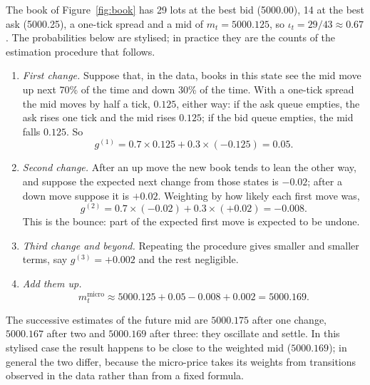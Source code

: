 \begin{example}
\label{ex:microprice}
The book of Figure~\ref{fig:book} has 29 lots at the best bid (5000.00), 14 at the best ask
(5000.25), a one-tick spread and a mid of $m_t = 5000.125$, so $\iota_t = 29/43 \approx 0.67$. The
probabilities below are stylised; in practice they are the counts of the estimation procedure that
follows.
\begin{enumerate}[leftmargin=1.8em,itemsep=2pt]
\item \emph{First change.} Suppose that, in the data, books in this state see the mid move up next 70\%
  of the time and down 30\% of the time. With a one-tick spread the mid moves by half a tick, $0.125$,
  either way: if the ask queue empties, the ask rises one tick and the mid rises $0.125$; if the bid
  queue empties, the mid falls $0.125$. So
  \[
    g^{(1)} = 0.7 \times 0.125 + 0.3 \times (-0.125) = 0.05 .
  \]
\item \emph{Second change.} After an up move the new book tends to lean the other way, and suppose the
  expected next change from those states is $-0.02$; after a down move suppose it is $+0.02$. Weighting
  by how likely each first move was,
  \[
    g^{(2)} = 0.7 \times (-0.02) + 0.3 \times (+0.02) = -0.008 .
  \]
This is the bounce: part of the expected first move is expected to be undone.
\item \emph{Third change and beyond.} Repeating the procedure gives smaller and smaller terms, say
  $g^{(3)} = +0.002$ and the rest negligible.
\item \emph{Add them up.}
  \[
    m^{\text{micro}}_t \approx 5000.125 + 0.05 - 0.008 + 0.002 = 5000.169 .
  \]
\end{enumerate}
The successive estimates of the future mid are $5000.175$ after one change, $5000.167$ after two and
$5000.169$ after three: they oscillate and settle. In this stylised case the result happens to be close
to the weighted mid ($5000.169$); in general the two differ, because the micro-price takes its weights
from transitions observed in the data rather than from a fixed formula.
\end{example}

